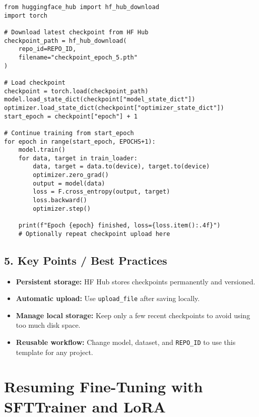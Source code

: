 \documentclass[a4paper, 12pt]{article}
\begin{document}
\begin{tcolorbox}[colback=green!5!white, colframe=green!75!black, title=Resume Training]
\begin{verbatim}
from huggingface_hub import hf_hub_download
import torch

# Download latest checkpoint from HF Hub
checkpoint_path = hf_hub_download(
    repo_id=REPO_ID,
    filename="checkpoint_epoch_5.pth"
)

# Load checkpoint
checkpoint = torch.load(checkpoint_path)
model.load_state_dict(checkpoint["model_state_dict"])
optimizer.load_state_dict(checkpoint["optimizer_state_dict"])
start_epoch = checkpoint["epoch"] + 1

# Continue training from start_epoch
for epoch in range(start_epoch, EPOCHS+1):
    model.train()
    for data, target in train_loader:
        data, target = data.to(device), target.to(device)
        optimizer.zero_grad()
        output = model(data)
        loss = F.cross_entropy(output, target)
        loss.backward()
        optimizer.step()

    print(f"Epoch {epoch} finished, loss={loss.item():.4f}")
    # Optionally repeat checkpoint upload here
\end{verbatim}
\end{tcolorbox}

\subsection*{5. Key Points / Best Practices}

\begin{tcolorbox}[colback=blue!5!white, colframe=blue!75!black, title=Notes]
\begin{itemize}
    \item \textbf{Persistent storage:} HF Hub stores checkpoints permanently and versioned.
    \item \textbf{Automatic upload:} Use \texttt{upload\_file} after saving locally.
    \item \textbf{Manage local storage:} Keep only a few recent checkpoints to avoid using too much disk space.
    \item \textbf{Reusable workflow:} Change model, dataset, and \texttt{REPO\_ID} to use this template for any project.
\end{itemize}
\end{tcolorbox}

\newpage
\newpage
\section*{Resuming Fine-Tuning with SFTTrainer and LoRA}
\end{document}
